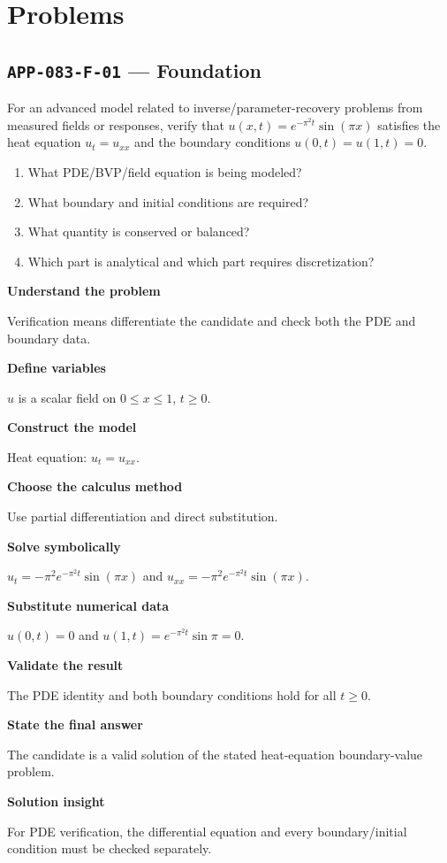 \documentclass[11pt]{book}
\newcommand{\pid}[1]{\texttt{#1}}
\begin{document}
\section*{Problems}
\subsection*{\pid{APP-083-F-01} — Foundation}
\begin{problembox}
For an advanced model related to inverse/parameter-recovery problems from measured fields or responses, verify that $u(x,t)=e^{-\pi^2t}\sin(\pi x)$ satisfies the heat equation $u_t=u_{xx}$ and the boundary conditions $u(0,t)=u(1,t)=0$.
\end{problembox}
\begin{promptbox}\begin{enumerate}
\item What PDE/BVP/field equation is being modeled?
\item What boundary and initial conditions are required?
\item What quantity is conserved or balanced?
\item Which part is analytical and which part requires discretization?
\end{enumerate}\end{promptbox}
\begin{solutionbox}
\textbf{Understand the problem}\par Verification means differentiate the candidate and check both the PDE and boundary data.\par\medskip
\textbf{Define variables}\par $u$ is a scalar field on $0\le x\le1$, $t\ge0$.\par\medskip
\textbf{Construct the model}\par Heat equation: $u_t=u_{xx}$.\par\medskip
\textbf{Choose the calculus method}\par Use partial differentiation and direct substitution.\par\medskip
\textbf{Solve symbolically}\par $u_t=-\pi^2 e^{-\pi^2t}\sin(\pi x)$ and $u_{xx}=-\pi^2 e^{-\pi^2t}\sin(\pi x)$.\par\medskip
\textbf{Substitute numerical data}\par $u(0,t)=0$ and $u(1,t)=e^{-\pi^2t}\sin\pi=0$.\par\medskip
\textbf{Validate the result}\par The PDE identity and both boundary conditions hold for all $t\ge0$.\par\medskip
\textbf{State the final answer}\par The candidate is a valid solution of the stated heat-equation boundary-value problem.\par\medskip
\textbf{Solution insight}\par For PDE verification, the differential equation and every boundary/initial condition must be checked separately.\par\medskip
\end{solutionbox}
\end{document}
